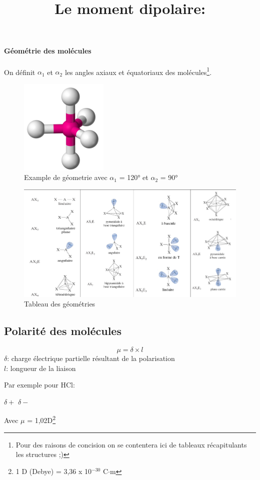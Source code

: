 \documentclass[10pt,a4paper]{book}
\begin{document}
\paragraph{Géométrie des molécules} On définit $\alpha_1$ et $\alpha_2$ les angles axiaux et équatoriaux des molécules\footnote{Pour des raisons de concision on se contentera ici de tableaux récapitulants les structures ;)}.
\begin{figure}[h!]
\begin{center}
\includegraphics[scale=0.75]{./assets/geometry_example.png}
\caption{Example de géometrie avec $\alpha_1$ = 120° et $\alpha_2$ = 90°}
\label{fig:geometry_ex}
\end{center}
\end{figure}
\begin{figure}[h!]
\begin{center}
\includegraphics[scale=0.65]{./assets/geometry_table.png}
\caption{Tableau des géométries}
\label{fig:geometry_table}
\end{center}
\end{figure}

\subsection{Polarité des molécules}

\title{Le moment dipolaire:}
\begin{displaymath}
\mu = \delta \times l
\end{displaymath}
$\delta$: charge électrique partielle résultant de la polarisation \\
$l$: longueur de la liaison \par
Par exemple pour HCl:
\begin{center}
$\delta+$ \; \; $\delta-$ \\
\end{center}
Avec $\mu$ = 1,02D\footnote{1 D (Debye) = 3,36 x 10$^{-30}$ C$\cdot$m}
\end{document}
